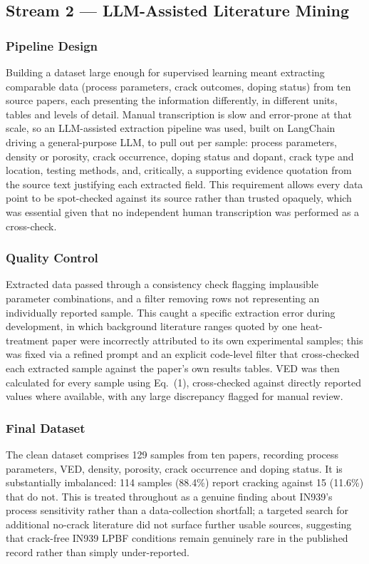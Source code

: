 \documentclass[a4paper]{article}
\begin{document}
\subsection{Stream 2 --- LLM-Assisted Literature Mining}
\subsubsection{Pipeline Design}
Building a dataset large enough for supervised learning meant extracting comparable data (process parameters, crack outcomes, doping status) from ten source papers, each presenting the information differently, in different units, tables and levels of detail. Manual transcription is slow and error-prone at that scale, so an LLM-assisted extraction pipeline was used, built on LangChain driving a general-purpose LLM, to pull out per sample: process parameters, density or porosity, crack occurrence, doping status and dopant, crack type and location, testing methods, and, critically, a supporting evidence quotation from the source text justifying each extracted field. This requirement allows every data point to be spot-checked against its source rather than trusted opaquely, which was essential given that no independent human transcription was performed as a cross-check.

\subsubsection{Quality Control}
Extracted data passed through a consistency check flagging implausible parameter combinations, and a filter removing rows not representing an individually reported sample. This caught a specific extraction error during development, in which background literature ranges quoted by one heat-treatment paper were incorrectly attributed to its own experimental samples; this was fixed via a refined prompt and an explicit code-level filter that cross-checked each extracted sample against the paper's own results tables. VED was then calculated for every sample using Eq.~(1), cross-checked against directly reported values where available, with any large discrepancy flagged for manual review.

\subsubsection{Final Dataset}
The clean dataset comprises 129 samples from ten papers, recording process parameters, VED, density, porosity, crack occurrence and doping status. It is substantially imbalanced: 114 samples (88.4\%) report cracking against 15 (11.6\%) that do not. This is treated throughout as a genuine finding about IN939's process sensitivity rather than a data-collection shortfall; a targeted search for additional no-crack literature did not surface further usable sources, suggesting that crack-free IN939 LPBF conditions remain genuinely rare in the published record rather than simply under-reported.
\end{document}
